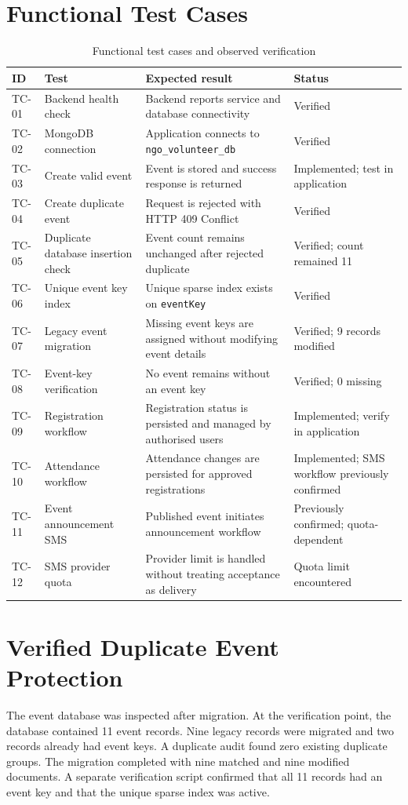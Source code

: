 \documentclass[12pt,a4paper,oneside]{report}
\begin{document}
\section{Functional Test Cases}
\begin{longtable}{|p{1.0cm}|p{4.0cm}|p{5.0cm}|p{3.0cm}|}
\caption{Functional test cases and observed verification}\\ \hline
\textbf{ID} & \textbf{Test} & \textbf{Expected result} & \textbf{Status}\\ \hline
TC-01 & Backend health check & Backend reports service and database connectivity & Verified\\ \hline
TC-02 & MongoDB connection & Application connects to \texttt{ngo\_volunteer\_db} & Verified\\ \hline
TC-03 & Create valid event & Event is stored and success response is returned & Implemented; test in application\\ \hline
TC-04 & Create duplicate event & Request is rejected with HTTP 409 Conflict & Verified\\ \hline
TC-05 & Duplicate database insertion check & Event count remains unchanged after rejected duplicate & Verified; count remained 11\\ \hline
TC-06 & Unique event key index & Unique sparse index exists on \texttt{eventKey} & Verified\\ \hline
TC-07 & Legacy event migration & Missing event keys are assigned without modifying event details & Verified; 9 records modified\\ \hline
TC-08 & Event-key verification & No event remains without an event key & Verified; 0 missing\\ \hline
TC-09 & Registration workflow & Registration status is persisted and managed by authorised users & Implemented; verify in application\\ \hline
TC-10 & Attendance workflow & Attendance changes are persisted for approved registrations & Implemented; SMS workflow previously confirmed\\ \hline
TC-11 & Event announcement SMS & Published event initiates announcement workflow & Previously confirmed; quota-dependent\\ \hline
TC-12 & SMS provider quota & Provider limit is handled without treating acceptance as delivery & Quota limit encountered\\ \hline
\end{longtable}

\section{Verified Duplicate Event Protection}
The event database was inspected after migration. At the verification point, the database contained 11 event records. Nine legacy records were migrated and two records already had event keys. A duplicate audit found zero existing duplicate groups. The migration completed with nine matched and nine modified documents. A separate verification script confirmed that all 11 records had an event key and that the unique sparse index was active.
\end{document}
